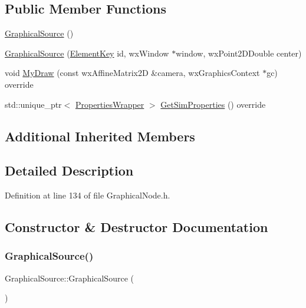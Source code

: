 \subsection*{Public Member Functions}
\begin{DoxyCompactItemize}
\item 
\hyperlink{class_graphical_source_ad798712e86d821da957bbb7864d76c5a}{Graphical\+Source} ()
\item 
\hyperlink{class_graphical_source_ad557a50f4519460a53e8f7b6f4b21f5b}{Graphical\+Source} (\hyperlink{_graphical_element_8h_ade5fd6c85839a416577ff9de1605141e}{Element\+Key} id, wx\+Window $\ast$window, wx\+Point2\+D\+Double center)
\item 
void \hyperlink{class_graphical_source_af01b1de06f0e6653edd60b59a279b154}{My\+Draw} (const wx\+Affine\+Matrix2D \&camera, wx\+Graphics\+Context $\ast$gc) override
\item 
std\+::unique\+\_\+ptr$<$ \hyperlink{class_graphical_node_1_1_properties_wrapper}{Properties\+Wrapper} $>$ \hyperlink{class_graphical_source_a3b7bb7a964e5a5b3a815a005711bb573}{Get\+Sim\+Properties} () override
\end{DoxyCompactItemize}
\subsection*{Additional Inherited Members}


\subsection{Detailed Description}


Definition at line 134 of file Graphical\+Node.\+h.



\subsection{Constructor \& Destructor Documentation}
\mbox{\label{class_graphical_source_ad798712e86d821da957bbb7864d76c5a}} 
\subsubsection{\texorpdfstring{Graphical\+Source()}{GraphicalSource()}\hspace{0.1cm}{\footnotesize\ttfamily [1/2]}}
{\footnotesize\ttfamily Graphical\+Source\+::\+Graphical\+Source (\begin{DoxyParamCaption}{ }\end{DoxyParamCaption})}



